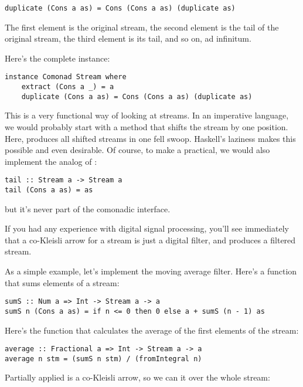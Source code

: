 \begin{Verbatim}[commandchars=\\\{\}]
duplicate (Cons a as) = Cons (Cons a as) (duplicate as)
\end{Verbatim}
The first element is the original stream, the second element is the tail
of the original stream, the third element is its tail, and so on, ad
infinitum.

Here's the complete instance:

\begin{Verbatim}[commandchars=\\\{\}]
instance Comonad Stream where
    extract (Cons a _) = a 
    duplicate (Cons a as) = Cons (Cons a as) (duplicate as)
\end{Verbatim}
This is a very functional way of looking at streams. In an imperative
language, we would probably start with a method  that
shifts the stream by one position. Here,  produces all
shifted streams in one fell swoop. Haskell's laziness makes this
possible and even desirable. Of course, to make a 
practical, we would also implement the analog of :

\begin{Verbatim}[commandchars=\\\{\}]
tail :: Stream a -> Stream a
tail (Cons a as) = as
\end{Verbatim}
but it's never part of the comonadic interface.

If you had any experience with digital signal processing, you'll see
immediately that a co-Kleisli arrow for a stream is just a digital
filter, and  produces a filtered stream.

As a simple example, let's implement the moving average filter. Here's a
function that sums  elements of a stream:

\begin{Verbatim}[commandchars=\\\{\}]
sumS :: Num a => Int -> Stream a -> a
sumS n (Cons a as) = if n <= 0 then 0 else a + sumS (n - 1) as
\end{Verbatim}
Here's the function that calculates the average of the first 
elements of the stream:

\begin{Verbatim}[commandchars=\\\{\}]
average :: Fractional a => Int -> Stream a -> a
average n stm = (sumS n stm) / (fromIntegral n)
\end{Verbatim}
Partially applied  is a co-Kleisli arrow, so we can
 it over the whole stream:

